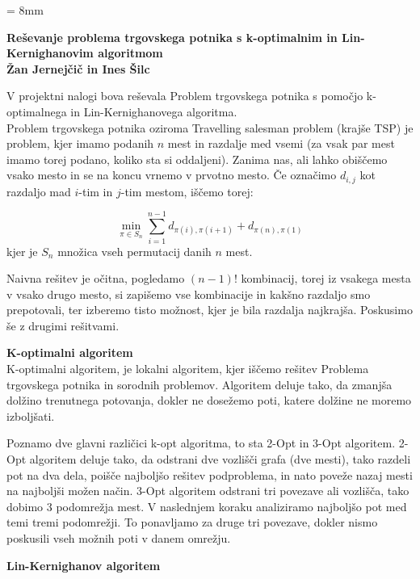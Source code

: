 \documentclass[a4paper,12pt]{article}
\begin{document}
\parindent = 8mm
\begin{center}
\textbf{Reševanje problema trgovskega potnika s k-optimalnim in Lin-Kernighanovim algoritmom}\\
\vspace{5 mm}
\textbf{Žan Jernejčič in Ines Šilc}
\end{center}

V projektni nalogi bova reševala Problem trgovskega potnika s pomočjo k-optimalnega in Lin-Kernighanovega algoritma.\\

Problem trgovskega potnika oziroma Travelling salesman problem (krajše TSP) je problem, kjer imamo podanih $n$ mest in razdalje med vsemi (za vsak par mest imamo torej podano, koliko sta si oddaljeni). Zanima nas, ali lahko obiščemo vsako mesto in se na koncu vrnemo v prvotno mesto. Če označimo $d_{i, j}$ kot razdaljo mad $i$-tim in $j$-tim mestom, iščemo torej:

$$
\min_{\pi \in S_n} \sum\limits_{i=1}^{n-1} d_{\pi (i), \pi (i+1)} + d_{\pi (n), \pi (1)}
$$
 kjer je $S_n$ množica vseh permutacij danih $n$ mest.
 
Naivna rešitev je očitna, pogledamo $(n-1)!$ kombinacij, torej iz vsakega mesta v vsako drugo mesto, si zapišemo vse kombinacije in kakšno razdaljo smo prepotovali, ter izberemo tisto možnost, kjer je bila razdalja najkrajša. Poskusimo še z drugimi rešitvami.

\vspace{5 mm}
\textbf{K-optimalni algoritem}\\

K-optimalni algoritem, je lokalni algoritem, kjer iščemo rešitev Problema trgovskega potnika in sorodnih problemov. Algoritem deluje tako, da zmanjša dolžino trenutnega potovanja, dokler ne dosežemo poti, katere dolžine ne moremo izboljšati.

Poznamo dve glavni različici k-opt algoritma, to sta 2-Opt in 3-Opt algoritem. 2-Opt algoritem deluje tako, da odstrani dve vozlišči grafa (dve mesti), tako razdeli pot na dva dela, poišče najboljšo rešitev podproblema, in nato poveže nazaj mesti na najboljši možen način. 3-Opt algoritem odstrani tri povezave ali vozlišča, tako dobimo 3 podomrežja mest. V naslednjem koraku analiziramo najboljšo pot med temi tremi podomrežji. To ponavljamo za druge tri povezave, dokler nismo poskusili vseh možnih poti v danem omrežju.


\vspace{5 mm}
\textbf{Lin-Kernighanov algoritem}\\
\end{document}
